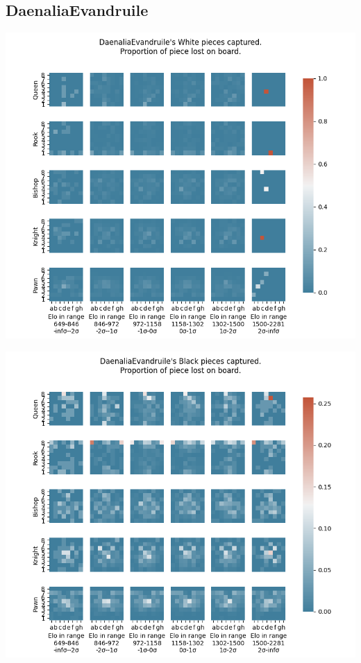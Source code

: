 \documentclass[11pt]{article}
\begin{document}
\subsection{DaenaliaEvandruile}
\label{sec:orgf959eb4}
\begin{center}
\includegraphics[width=\textwidth]{Images/DaenaliaEvandruile_HEATMAP_Queen_Rook_Bishop_Knight_Pawn_WHITE_ELO.png}
\end{center}

\begin{center}
\includegraphics[width=\textwidth]{Images/DaenaliaEvandruile_HEATMAP_Queen_Rook_Bishop_Knight_Pawn_BLACK_ELO.png}
\end{center}
\end{document}
